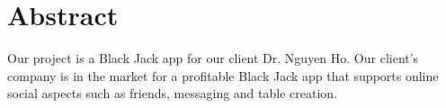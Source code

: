 \section*{Abstract}






Our project is a Black Jack app for our client Dr. Nguyen Ho. Our client's company is in the market for a profitable Black Jack app that supports online social aspects such as friends, messaging and table creation. 



